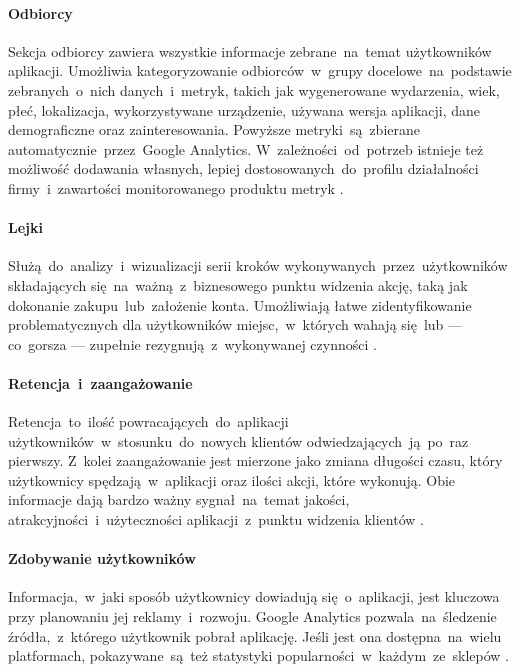 \paragraph{Odbiorcy}
\label{par:ga-audiences}
Sekcja odbiorcy zawiera wszystkie informacje zebrane~na~temat użytkowników aplikacji. Umożliwia kategoryzowanie odbiorców~w~grupy docelowe~na~podstawie zebranych~o~nich danych~i~metryk, takich jak wygenerowane wydarzenia, wiek, płeć, lokalizacja, wykorzystywane urządzenie, używana wersja aplikacji, dane demograficzne oraz zainteresowania. Powyższe metryki~są~zbierane automatycznie~przez~Google Analytics. W~zależności~od~potrzeb istnieje też możliwość dodawania własnych, lepiej dostosowanych~do~profilu działalności firmy~i~zawartości monitorowanego produktu metryk \cite{GA_Audiences}.

\paragraph{Lejki}
\label{par:ga-funnels}
Służą~do~analizy~i~wizualizacji serii kroków wykonywanych~przez~użytkowników składających się~na~ważną~z~biznesowego punktu widzenia akcję, taką jak dokonanie zakupu~lub~założenie konta. Umożliwiają łatwe zidentyfikowanie problematycznych dla użytkowników miejsc,~w~których wahają się~lub --- co~gorsza --- zupełnie rezygnują~z~wykonywanej czynności \cite{GA_Funnels}.

\paragraph{Retencja~i~zaangażowanie} 
\label{par:ga-retention}
Retencja~to~ilość powracających~do~aplikacji  użytkowników~w~stosunku~do~nowych klientów odwiedzających~ją~po~raz pierwszy. Z~kolei zaangażowanie jest mierzone jako zmiana długości czasu, który użytkownicy spędzają~w~aplikacji oraz ilości akcji, które wykonują. Obie informacje dają bardzo ważny sygnał~na~temat jakości, atrakcyjności~i~użyteczności aplikacji~z~punktu widzenia klientów \cite{GA_Retention}.

\paragraph{Zdobywanie użytkowników}
Informacja,~w~jaki sposób użytkownicy dowiadują się~o~aplikacji, jest kluczowa przy planowaniu jej reklamy~i~rozwoju. Google Analytics pozwala~na~śledzenie źródła,~z~którego użytkownik pobrał aplikację. Jeśli jest ona dostępna~na~wielu platformach, pokazywane~są~też statystyki popularności~w~każdym~ze~sklepów \cite{GA_Aquisition}.
